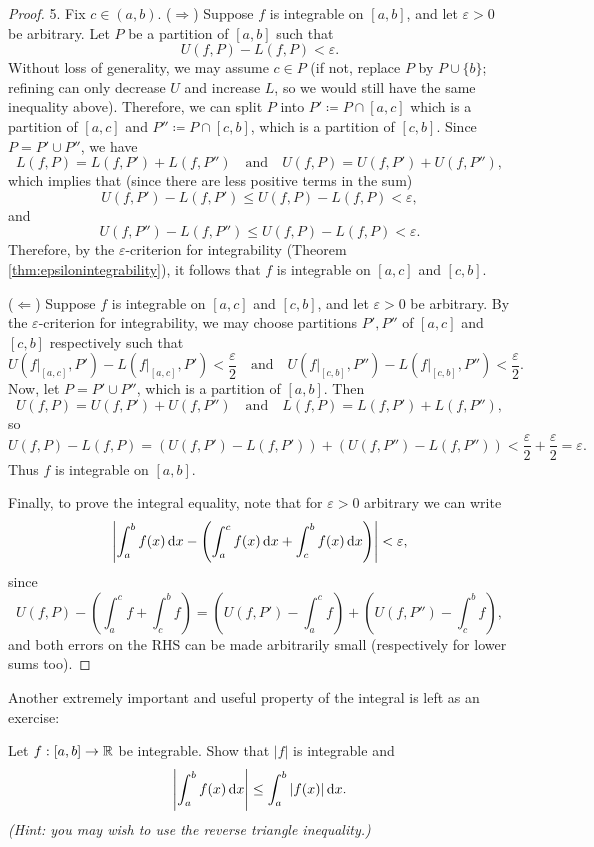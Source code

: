 \documentclass[../analysis1.tex]{subfiles}
\begin{document}
\begin{proof}
5. Fix $c\in (a,b)$. ($\Rightarrow$) Suppose $f$ is integrable on $[a,b]$, and let $\varepsilon>0$ be arbitrary. Let $P$ be a partition of $[a,b]$ such that \[U(f,P)-L(f,P)<\varepsilon.\]
Without loss of generality, we may assume $c\in P$ (if not, replace $P$ by $P\cup \{b\}$; refining can only decrease $U$ and increase $L$, so we would still have the same inequality above).
Therefore, we can split $P$ into $P'\coloneqq P\cap [a,c]$ which is a partition of $[a,c]$ and $P''\coloneqq P\cap [c,b]$, which is a partition of $[c,b]$. Since $P=P'\cup P''$, we have
\[L(f,P)=L(f,P')+L(f,P'')\quad\text{and}\quad U(f,P)=U(f,P')+U(f,P''),\]
which implies that (since there are less positive terms in the sum)
\[U(f,P')-L(f,P')\le U(f,P)-L(f,P)<\varepsilon,\]
and
\[U(f,P'')-L(f,P'')\le U(f,P)-L(f,P)<\varepsilon.\]
Therefore, by the $\varepsilon$-criterion for integrability (Theorem \ref{thm:epsilonintegrability}), it follows that $f$ is integrable on $[a,c]$ and $[c,b]$.

($\Leftarrow$) Suppose $f$ is integrable on $[a,c]$ and $[c,b]$, and let $\varepsilon>0$ be arbitrary. By the $\varepsilon$-criterion for integrability, we may choose partitions $P',P''$ of $[a,c]$ and $[c,b]$ respectively such that
\[U(f|_{[a,c]},P')-L(f|_{[a,c]},P')<\frac{\varepsilon}{2}\quad\text{and}\quad U(f|_{[c,b]},P'')-L(f|_{[c,b]},P'')<\frac{\varepsilon}{2}.\]
Now, let $P=P'\cup P''$, which is a partition of $[a,b]$. Then
\[U(f,P)=U(f,P')+U(f,P'')\quad\text{and}\quad L(f,P)=L(f,P')+L(f,P''),\]
so
\[U(f,P)-L(f,P)=(U(f,P')-L(f,P'))+(U(f,P'')-L(f,P''))<\frac{\varepsilon}{2}+\frac{\varepsilon}{2}=\varepsilon.\]
Thus $f$ is integrable on $[a,b]$.

Finally, to prove the integral equality, note that for $\varepsilon>0$ arbitrary we can write
\[\left|\int_a^b f(x)\d{x}-\left(\int_a^c f(x)\d{x}+\int_c^b f(x)\d{x}\right)\right|<\varepsilon,\]
since \[U(f,P)-\left(\int_a^c f + \int_c^b f\right)=\left(U(f,P')-\int_a^c f\right) + \left(U(f,P'')-\int_c^b f\right),\]
and both errors on the RHS can be made arbitrarily small (respectively for lower sums too).\qedhere
\end{proof}

Another extremely important and useful property of the integral is left as an exercise:
\begin{exercise*}
    Let $f:[a,b]\to\mathbb{R}$ be integrable. Show that $|f|$ is integrable and
    \[\left|\int_a^b f(x)\d{x} \right| \le \int_a^b |f(x)|\d{x}.\]\textit{(Hint: you may wish to use the reverse triangle inequality.)}
\end{exercise*}
\end{document}
